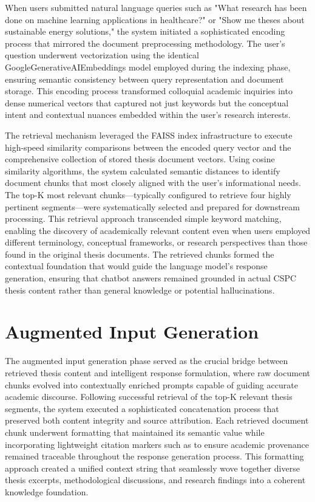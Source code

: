 \begin{refsection}
When users submitted natural language queries such as "What research has been done on machine learning applications in healthcare?" or "Show me theses about sustainable energy solutions," the system initiated a sophisticated encoding process that mirrored the document preprocessing methodology. The user's question underwent vectorization using the identical GoogleGenerativeAIEmbeddings model employed during the indexing phase, ensuring semantic consistency between query representation and document storage. This encoding process transformed colloquial academic inquiries into dense numerical vectors that captured not just keywords but the conceptual intent and contextual nuances embedded within the user's research interests.

The retrieval mechanism leveraged the FAISS index infrastructure to execute high-speed similarity comparisons between the encoded query vector and the comprehensive collection of stored thesis document vectors. Using cosine similarity algorithms, the system calculated semantic distances to identify document chunks that most closely aligned with the user's informational needs. The top-K most relevant chunks—typically configured to retrieve four highly pertinent segments—were systematically selected and prepared for downstream processing. This retrieval approach transcended simple keyword matching, enabling the discovery of academically relevant content even when users employed different terminology, conceptual frameworks, or research perspectives than those found in the original thesis documents. The retrieved chunks formed the contextual foundation that would guide the language model's response generation, ensuring that chatbot answers remained grounded in actual CSPC thesis content rather than general knowledge or potential hallucinations.


\section{Augmented Input Generation}
The augmented input generation phase served as the crucial bridge between retrieved thesis content and intelligent response formulation, where raw document chunks evolved into contextually enriched prompts capable of guiding accurate academic discourse. Following successful retrieval of the top-K relevant thesis segments, the system executed a sophisticated concatenation process that preserved both content integrity and source attribution. Each retrieved document chunk underwent formatting that maintained its semantic value while incorporating lightweight citation markers such as to ensure academic provenance remained traceable throughout the response generation process. This formatting approach created a unified context string that seamlessly wove together diverse thesis excerpts, methodological discussions, and research findings into a coherent knowledge foundation.


\end{refsection}
